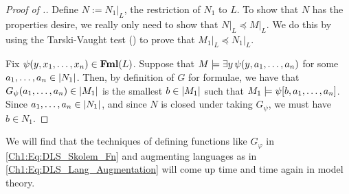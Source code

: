 \begin{proof}[Proof of .]
    Define $N := N_1\vert_{L}$, the restriction of $N_1$ to $L$. To show that $N$ has the properties desire, we really only need to show that $N\vert_L \preceq M \vert_L$. We do this by using the Tarski-Vaught test () to prove that $M_1\vert_{L} \preceq N_1\vert_{L}$.

    Fix $\psi\!\left( y, x_1, \ldots, x_n \right) \in \mathbf{Fml}(L)$. Suppose that $M \models \exists y \, \psi\!\left( y, a_1, \ldots, a_n \right)$ for some $a_1, \ldots, a_n \in \left\lvert N_1 \right\rvert$. Then, by definition of $G$ for formulae, we have that $G_{\psi}\!\left( a_1, \ldots, a_n \right) \in \left\lvert M_1 \right\rvert$ is the smallest $b \in \left\lvert M_1 \right\rvert$ such that $M_1 \models \psi\!\left[ b, a_1, \ldots, a_n \right]$. Since $a_1, \ldots, a_n \in \left\lvert N_1 \right\rvert$, and since $N$ is closed under taking $G_{\psi}$, we must have $b \in N_1$.
    
\end{proof}

We will find that the techniques of defining functions like $G_{\varphi}$ in \eqref{Ch1:Eq:DLS_Skolem_Fn} and augmenting languages as in \eqref{Ch1:Eq:DLS_Lang_Augmentation} will come up time and time again in model theory.